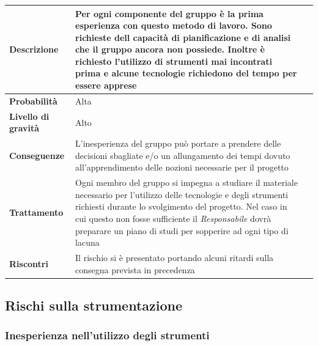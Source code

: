 \begin{center}
	
	\begin{tabular}{|>{\centering}m{4cm} ||>{\centering}m{8cm} |>{\centering\arraybackslash}m{0pt}@{}|}
		\hline
		\textbf{Descrizione} & Per ogni componente del gruppo è la
		prima esperienza con questo metodo di lavoro. Sono richieste dell
		capacità di pianificazione e di analisi che il gruppo ancora non
		possiede. Inoltre è richiesto l’utilizzo di strumenti mai
		incontrati prima e alcune tecnologie richiedono del tempo per
		essere apprese & \\[2ex]
		\hline	
		\textbf{Probabilità} & Alta &\\[1ex]
		\hline
		\textbf{Livello di gravità} & Alto & \\[1ex]
		\hline
		\textbf{Conseguenze} & L'inesperienza del gruppo può portare a prendere delle decisioni sbagliate e/o un allungamento dei tempi dovuto all'apprendimento delle nozioni necessarie per il progetto & \\[1ex]
		\hline
		\textbf{Trattamento} & Ogni membro del gruppo si impegna a
		studiare il materiale necessario per l’utilizzo delle tecnologie e
		degli strumenti richiesti durante lo svolgimento del progetto. Nel
		caso in cui questo non fosse sufficiente il  \emph{Responsabile}  dovrà
		preparare un piano di studi per sopperire ad ogni tipo di lacuna & \\[1ex] 
		\hline
		\textbf{Riscontri} & Il rischio si è presentato portando alcuni ritardi sulla consegna prevista in precedenza & \\[1ex]
		\hline
	\end{tabular}
	
\end{center}

\subsection{Rischi sulla strumentazione}
\subsubsection{Inesperienza nell'utilizzo degli strumenti}

